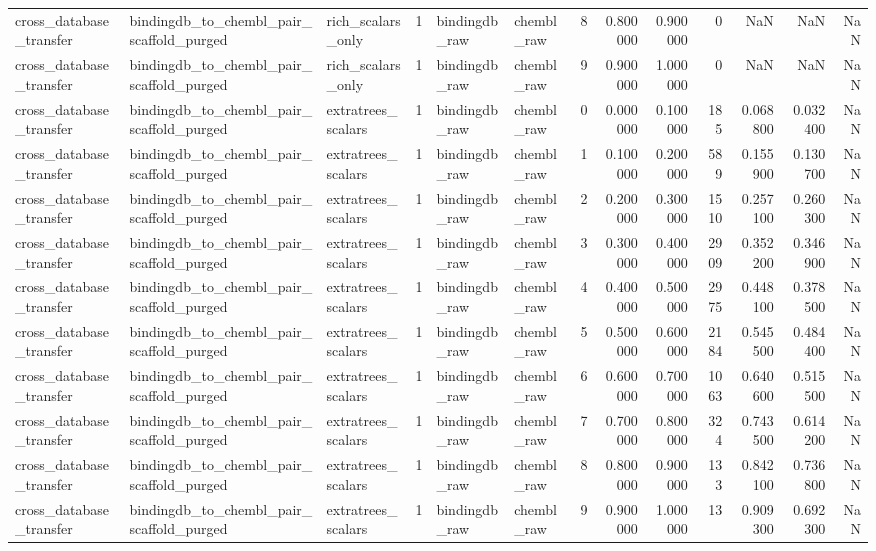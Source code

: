 \begin{longtable}{lllrllrrrrrrr}
cross\_database\_transfer & bindingdb\_to\_chembl\_pair\_scaffold\_purged & rich\_scalars\_only & 1 & bindingdb\_raw & chembl\_raw & 8 & 0.800000 & 0.900000 & 0 & NaN & NaN & NaN \\
cross\_database\_transfer & bindingdb\_to\_chembl\_pair\_scaffold\_purged & rich\_scalars\_only & 1 & bindingdb\_raw & chembl\_raw & 9 & 0.900000 & 1.000000 & 0 & NaN & NaN & NaN \\
cross\_database\_transfer & bindingdb\_to\_chembl\_pair\_scaffold\_purged & extratrees\_scalars & 1 & bindingdb\_raw & chembl\_raw & 0 & 0.000000 & 0.100000 & 185 & 0.068800 & 0.032400 & NaN \\
cross\_database\_transfer & bindingdb\_to\_chembl\_pair\_scaffold\_purged & extratrees\_scalars & 1 & bindingdb\_raw & chembl\_raw & 1 & 0.100000 & 0.200000 & 589 & 0.155900 & 0.130700 & NaN \\
cross\_database\_transfer & bindingdb\_to\_chembl\_pair\_scaffold\_purged & extratrees\_scalars & 1 & bindingdb\_raw & chembl\_raw & 2 & 0.200000 & 0.300000 & 1510 & 0.257100 & 0.260300 & NaN \\
cross\_database\_transfer & bindingdb\_to\_chembl\_pair\_scaffold\_purged & extratrees\_scalars & 1 & bindingdb\_raw & chembl\_raw & 3 & 0.300000 & 0.400000 & 2909 & 0.352200 & 0.346900 & NaN \\
cross\_database\_transfer & bindingdb\_to\_chembl\_pair\_scaffold\_purged & extratrees\_scalars & 1 & bindingdb\_raw & chembl\_raw & 4 & 0.400000 & 0.500000 & 2975 & 0.448100 & 0.378500 & NaN \\
cross\_database\_transfer & bindingdb\_to\_chembl\_pair\_scaffold\_purged & extratrees\_scalars & 1 & bindingdb\_raw & chembl\_raw & 5 & 0.500000 & 0.600000 & 2184 & 0.545500 & 0.484400 & NaN \\
cross\_database\_transfer & bindingdb\_to\_chembl\_pair\_scaffold\_purged & extratrees\_scalars & 1 & bindingdb\_raw & chembl\_raw & 6 & 0.600000 & 0.700000 & 1063 & 0.640600 & 0.515500 & NaN \\
cross\_database\_transfer & bindingdb\_to\_chembl\_pair\_scaffold\_purged & extratrees\_scalars & 1 & bindingdb\_raw & chembl\_raw & 7 & 0.700000 & 0.800000 & 324 & 0.743500 & 0.614200 & NaN \\
cross\_database\_transfer & bindingdb\_to\_chembl\_pair\_scaffold\_purged & extratrees\_scalars & 1 & bindingdb\_raw & chembl\_raw & 8 & 0.800000 & 0.900000 & 133 & 0.842100 & 0.736800 & NaN \\
cross\_database\_transfer & bindingdb\_to\_chembl\_pair\_scaffold\_purged & extratrees\_scalars & 1 & bindingdb\_raw & chembl\_raw & 9 & 0.900000 & 1.000000 & 13 & 0.909300 & 0.692300 & NaN \\

\end{longtable}
